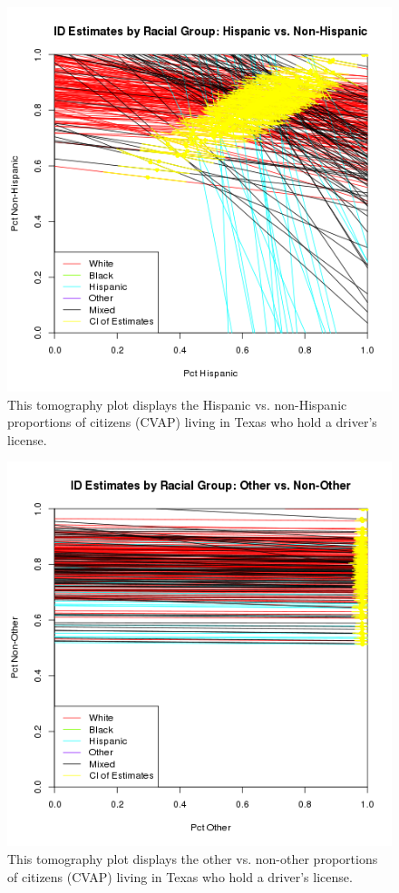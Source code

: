 \documentclass[12pt]{article}
\begin{document}
\begin{figure}[htb]
\begin{centering}
\includegraphics[scale=.75]{figs/CVAP_f3_dl_hispanic.png}
\caption{\label{tomog_hispanic}This tomography plot displays the Hispanic vs. non-Hispanic proportions of citizens (CVAP)
living in Texas who hold a driver's license.}
\end{centering}
\end{figure}


\begin{figure}[htb]
\begin{centering}
\includegraphics[scale=.75]{figs/CVAP_f3_dl_other.png}
\caption{\label{tomog_other}This tomography plot displays the other vs. non-other proportions of citizens (CVAP)
living in Texas who hold a driver's license.}
\end{centering}
\end{figure}
\end{document}
